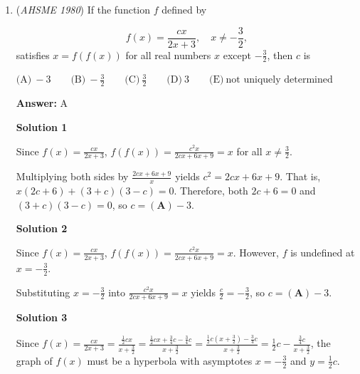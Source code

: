 \begin{enumerate}
 Since each step is half as long as and rotated $90^{\circ}$ counterclockwise from the previous step, the complex number representing a step must be $\frac{1}{2}i$ times the complex number representing the previous step.

 Therefore, the bug's path can be represented by an infinite geometric series with first term $1$ and common ratio $\frac{1}{2}i$.  The sum of this series is $\frac{1}{1-\frac{1}{2}i} = \frac{2}{2-i} = \frac{2(2+i)}{(2-i)(2+i)} = \frac{4}{5} + \frac{2}{5}i$, which corresponds to $\boxed{(\textbf{B}) \left(\frac{4}{5}, \frac{2}{5}\right)}$

 -jaspersun, edited by j314andrews

 


	\item (\textit{AHSME 1980}) If the function $f$ defined by 

 \[f(x)=\frac{cx}{2x+3} ,\quad x\neq -\frac{3}{2} ,\] 
satisfies $x=f(f(x))$ for all real numbers $x$ except $-\frac{3}{2}$, then $c$ is


 $\text{(A)} \ -3 \qquad  \text{(B)} \ - \frac{3}{2} \qquad  \text{(C)} \ \frac{3}{2} \qquad  \text{(D)} \ 3 \qquad  \text{(E)} \ \text{not uniquely determined}$

 \textbf{Answer: }A



\textbf{Solution 1}

Since $f(x)=\frac{cx}{2x+3}$, $f(f(x)) = \frac{c^2x}{2cx+6x+9} = x$ for all $x \neq \frac{3}{2}$. 

 Multiplying both sides by $\frac{2cx+6x+9}{x}$ yields $c^2=2cx+6x+9$. That is, $x(2c+6) + (3+c)(3-c) = 0$. Therefore, both $2c+6 = 0$ and $(3+c)(3-c) = 0$, so $c= \boxed{(\textbf{A}) -3}$.

 



\textbf{Solution 2}

Since $f(x)=\frac{cx}{2x+3}$, $f(f(x)) = \frac{c^2x}{2cx+6x+9} = x$.  However, $f$ is undefined at $x=-\frac{3}{2}$. 

 Substituting $x=-\frac{3}{2}$ into $\frac{c^2x}{2cx+6x+9} = x$ yields $\frac{c}{2} = -\frac{3}{2}$, so $c= \boxed{(\textbf{A}) -3}$.

 



\textbf{Solution 3}

Since $f(x) = \frac{cx}{2x+3} = \frac{\frac{1}{2}cx}{x+\frac{3}{2}} = \frac{\frac{1}{2}cx + \frac{3}{4}c - \frac{3}{4}c}{x+\frac{3}{2}} = \frac{\frac{1}{2}c\left(x+\frac{3}{2}\right) - \frac{3}{4}c}{x+\frac{3}{2}} = \frac{1}{2}c - \frac{\frac{3}{4}c}{x+\frac{3}{2}}$, the graph of $f(x)$ must be a hyperbola with asymptotes $x=-\frac{3}{2}$ and $y=\frac{1}{2}{c}$.  


\end{enumerate}
